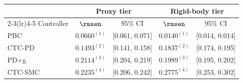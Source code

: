 \begin{tabular}{lcccc}
\toprule
& \multicolumn{2}{c}{Proxy tier} & \multicolumn{2}{c}{Rigid-body tier} \\
\cmidrule(lr){2-3}\cmidrule(lr){4-5}
Controller & $\rmsen$ & 95\% CI & $\rmsen$ & 95\% CI \\
\midrule
PBC     & $0.0660^{(1)}$ & [0.061, 0.071] & $0.0140^{(1)}$ & [0.014, 0.014] \\
CTC-PD  & $0.1493^{(2)}$ & [0.141, 0.158] & $0.1837^{(2)}$ & [0.174, 0.195] \\
PD+g    & $0.2114^{(3)}$ & [0.204, 0.219] & $0.1989^{(3)}$ & [0.195, 0.202] \\
CTC-SMC & $0.2235^{(4)}$ & [0.206, 0.242] & $0.2775^{(4)}$ & [0.253, 0.302] \\
\bottomrule
\end{tabular}
